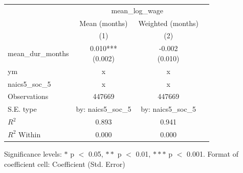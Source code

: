 \renewcommand\cellalign{t}
\begin{threeparttable}
\begin{tabular}{lccc}
\toprule
 & \multicolumn{2}{c}{mean_log_wage} \\
\cmidrule(lr){2-3} 
 & Mean (months) & Weighted (months) \\
 & (1) & (2) \\
\midrule
\addlinespace
mean_dur_months & \makecell{0.010*** \\ (0.002)} & \makecell{-0.002 \\ (0.010)} \\
\midrule
\addlinespace
ym & x & x \\
naics5_soc_5 & x & x \\
\midrule
\addlinespace
Observations & 447669 & 447669 \\
S.E. type & by: naics5_soc_5 & by: naics5_soc_5 \\
$R^2$ & 0.893 & 0.941 \\
$R^2$ Within & 0.000 & 0.000 \\
\bottomrule
\end{tabular}
\footnotesize Significance levels: $*$ p $<$ 0.05, $**$ p $<$ 0.01, $***$ p $<$ 0.001. Format of coefficient cell: Coefficient 
 (Std. Error)
\end{threeparttable}